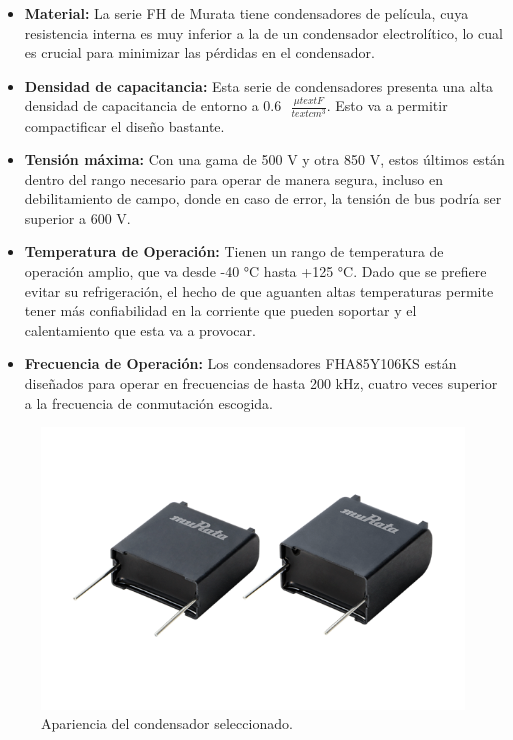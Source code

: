\begin{itemize}
	\item \textbf{Material:} La serie FH de Murata tiene condensadores de película, cuya resistencia interna es muy inferior a la de un condensador electrolítico, lo cual es crucial para minimizar las pérdidas en el condensador.
	
	\item \textbf{Densidad de capacitancia:} Esta serie de condensadores presenta una alta densidad de capacitancia de entorno a $0.6\text{ }\frac{\mu text{F}}{text{cm}^3}$. Esto va a permitir compactificar el diseño bastante.
	
	\item \textbf{Tensión máxima:} Con una gama de 500 V y otra 850 V, estos últimos están dentro del rango necesario para operar de manera segura, incluso en debilitamiento de campo, donde en caso de error, la tensión de bus podría ser superior a 600 V.
	
	\item \textbf{Temperatura de Operación:} Tienen un rango de temperatura de operación amplio, que va desde -40 °C hasta +125 °C. Dado que se prefiere evitar su refrigeración, el hecho de que aguanten altas temperaturas permite tener más confiabilidad en la corriente que pueden soportar y el calentamiento que esta va a provocar.
	
	\item \textbf{Frecuencia de Operación:} Los condensadores FHA85Y106KS están diseñados para operar en frecuencias de hasta 200 kHz, cuatro veces superior a la frecuencia de conmutación escogida.
	
	
\end{itemize}

\begin{figure}[H]
	\centering
	\includegraphics[width=0.7\linewidth]{fig/FHA85Y106KS}
	\caption{Apariencia del condensador seleccionado.}
\end{figure}


